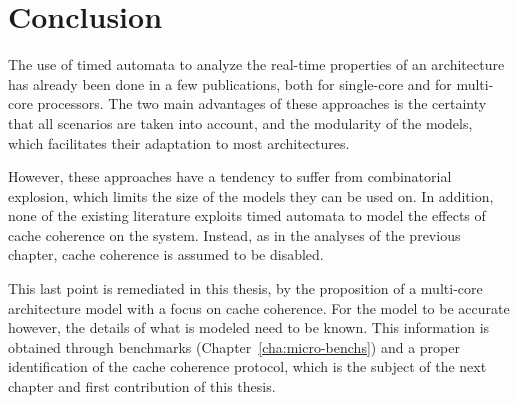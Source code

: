 \section{Conclusion}
The use of timed automata to analyze the real-time properties of an architecture
has already been done in a few publications, both for single-core and for
multi-core processors. The two main advantages of these approaches is the
certainty that all scenarios are taken into account, and the modularity of the
models, which facilitates their adaptation to most architectures.

However, these approaches have a tendency to suffer from combinatorial
explosion, which limits the size of the models they can be used on. In addition,
none of the existing literature exploits timed automata to model the effects
of cache coherence on the system. Instead, as in the analyses of the
previous chapter, cache coherence is assumed to be disabled.

This last point is remediated in this thesis, by the proposition of a multi-core
architecture model with a focus on cache coherence. For the model to be
accurate however, the details of what is modeled need to be known. This
information is obtained through benchmarks (Chapter~\ref{cha:micro-benchs})
and a proper identification of the cache coherence protocol, which is the
subject of the next chapter and first contribution of this thesis.
